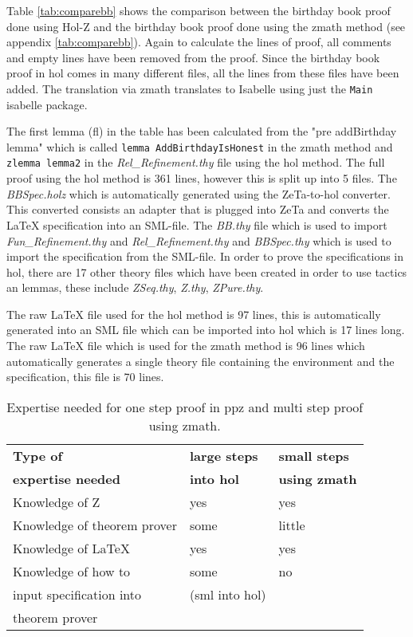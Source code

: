 Table \ref{tab:comparebb} shows the comparison between the birthday book proof done using Hol-Z \cite{hol-z} and the birthday book proof done using the \gls{zmath} method (see appendix \ref{tab:comparebb}). Again to calculate the lines of proof, all comments and empty lines have been removed from the proof. Since the birthday book proof in \gls{hol} comes in many different files, all the lines from these files have been added. The translation via \gls{zmath} translates to Isabelle using just the \texttt{Main} isabelle package.

The first lemma (fl) in the table has been calculated from the "pre addBirthday lemma" which is called \texttt{lemma AddBirthdayIsHonest} in the \gls{zmath} method and \texttt{zlemma lemma2} in the \emph{Rel\_Refinement.thy} file using the \gls{hol} method. The full proof using the \gls{hol} method is 361 lines, however this is split up into 5 files. The \emph{BBSpec.holz} which is automatically generated using the ZeTa-to-\gls{hol} converter. This converted consists an adapter that is plugged into ZeTa and converts the \LaTeX{} specification into an SML-file. The \emph{BB.thy} file which is used to import \emph{Fun\_Refinement.thy} and \emph{Rel\_Refinement.thy} and \emph{BBSpec.thy} which is used to import the specification from the SML-file. In order to prove the specifications in \gls{hol}, there are 17 other theory files which have been created in order to use tactics an lemmas, these include \emph{ZSeq.thy}, \emph{Z.thy}, \emph{ZPure.thy}.

The raw \LaTeX{} file used for the \gls{hol} method is 97 lines, this is automatically generated into an SML file which can be imported into \gls{hol} which is 17 lines long. The raw \LaTeX{} file which is used for the \gls{zmath} method is 96 lines which automatically generates a single theory file containing the environment and the specification, this file is 70 lines.

\begin{table}[H]
\begin{center}
\begin{tabular}{| l | l | l |}
\hline
\textbf{Type of} & \textbf{large steps} & \textbf{small steps} \\
\textbf{expertise needed} & \textbf{into \gls{hol}} & \textbf{using \gls{zmath}} \\
\hline
\hline
Knowledge of Z &  yes & yes \\
\hline
Knowledge of theorem prover & some & little \\
\hline
Knowledge of \LaTeX & yes & yes \\
\hline
Knowledge of how to & some & no \\
input specification into &(sml into \gls{hol})&  \\
theorem prover &  &  \\
\hline
\end{tabular}
\end{center}
\caption{Expertise needed for one step proof in \gls{ppz} and multi step proof using \gls{zmath}.}
\label{tab:expertisebb}
\end{table}

